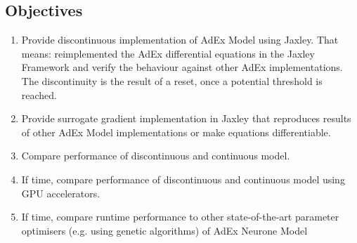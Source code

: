 \documentclass[11pt,a4paper]{article}
\begin{document}
\subsection*{Objectives}
\begin{enumerate}
\item Provide discontinuous implementation of AdEx Model using Jaxley. That means: reimplemented the AdEx differential equations in the Jaxley Framework
      and verify the behaviour against other AdEx implementations.
      The discontinuity is the result of a reset, once a potential threshold is reached.
\item Provide surrogate gradient implementation in Jaxley that reproduces results of other AdEx Model implementations or make equations differentiable.
\item Compare performance of discontinuous and continuous model.
\item If time, compare performance of discontinuous and continuous model using GPU accelerators.
\item If time, compare runtime performance to other state-of-the-art parameter optimisers (e.g. using genetic algorithms) of AdEx Neurone Model
\end{enumerate}
\end{document}
